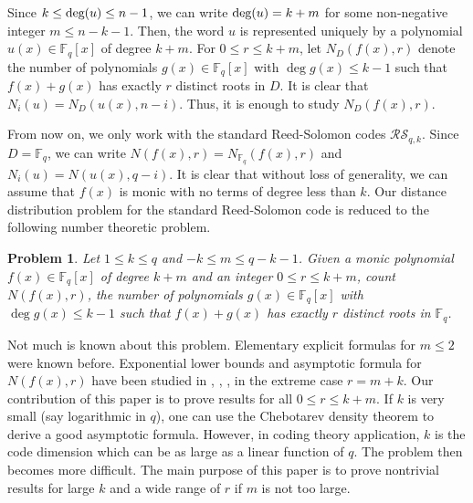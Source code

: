 \documentclass[reqno]{amsart}
\newtheorem{prob}[thm]{Problem}
\theoremstyle{remark}
\numberwithin{equation}{section}
\newcommand{\de}{\textup{deg}}
\newcommand{\f}{\mathbb{F}_q}
\begin{document}
Since $k \leq \de(u) \leq n-1$, we can write $\de(u) = k+m$ for some non-negative integer $m \leq n-k-1$.
Then, the word $u$ is represented uniquely by
a polynomial $u(x)\in \f[x]$ of degree $k+m$.
For $0\leq r\leq k+m$, let $N_D(f(x), r)$ denote the number of  polynomials $g(x)\in\f[x]$  with  $\deg g(x) \leq k-1$ such that
$ f(x)+g(x)$ has exactly $r$ distinct roots in $D$.
It is clear that $N_i(u) = N_D(u(x), n-i)$. Thus, it is enough to study $N_D(f(x), r)$.

From now on, we only work with the standard Reed-Solomon codes $\mathcal{RS}_{q,k}$. Since $D=\f$, we can write $N(f(x), r) = N_{\f}(f(x), r)$
and $N_i(u) = N(u(x), q-i)$. It is clear that without loss of generality, we can assume that $f(x)$ is monic with no terms of degree less than $k$.
Our distance distribution problem for the standard Reed-Solomon code is reduced to the following number theoretic problem.

\begin{prob} Let $1\leq k \leq q$ and $-k \leq m\leq q-k-1$.
Given a monic polynomial $f(x)\in \f [x]$ of degree $k+m$ and an integer $0\leq r\leq k+m$, count $N(f(x), r)$,  the number  of polynomials $g(x)\in\f[x]$  with  $\deg g(x) \leq k-1$ such that $f(x)+g(x)$ has exactly $r$ distinct roots in $\f$.
\end{prob}
%
%

Not much is  known about this problem. Elementary explicit formulas for $m\leq 2$ were known before.
Exponential lower bounds and asymptotic formula for $N(f(x), r)$ have been studied in \cite{CW0}, \cite{CW1}, \cite{CW2}, \cite{LW2} in the extreme case $r=m+k$.
Our contribution of this paper is to prove results for all $0\leq r\leq k+m$.
If $k$ is very small (say logarithmic in $q$),  one can use the Chebotarev density theorem to derive a
good asymptotic formula. However, in coding theory application, $k$ is the code dimension which can be as large as a linear function of $q$. The problem then becomes more difficult.  The main purpose of this paper is to prove nontrivial results for large $k$ and a wide range of $r$ if $m$ is not too large.
\end{document}
